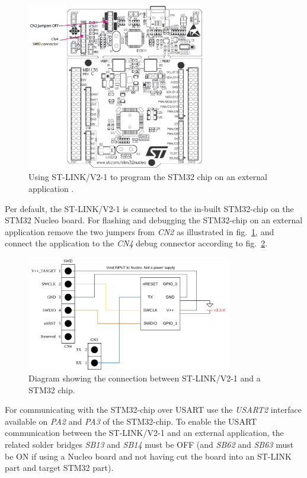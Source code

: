 \begin{figure}[H]
  \centering
  \includegraphics[width=0.7\textwidth]{figures/Nucleo_SWD.png}
  \caption{Using ST-LINK/V2-1 to program the STM32 chip on an external application \cite[p.~19]{STM32_Nucleo_user_manual}.}
  \label{fig:nucleo_swd}
\end{figure}

Per default, the ST-LINK/V2-1 is connected to the in-built STM32-chip on the STM32 Nucleo board. For flashing and debugging the STM32-chip on an external application remove the two jumpers from \textit{CN2} as illustrated in fig.~\ref{fig:nucleo_swd}, and connect the application to the \textit{CN4} debug connector according to fig.~\ref{fig:schematic_stlink}.

\begin{figure}[H]
  \centering
  \includegraphics[width=0.8\textwidth]{figures/STLink_SWD_wiring.png}
  \caption{Diagram showing the connection between ST-LINK/V2-1 and a STM32 chip.}
  \label{fig:schematic_stlink}
\end{figure}

For communicating with the STM32-chip over \ac{USART} use the \textit{USART2} interface available on \textit{PA2} and \textit{PA3} of the STM32-chip. To enable the \ac{USART} communication between the ST-LINK/V2-1 and an external application, the related solder bridges \textit{SB13} and \textit{SB14} must be OFF (and \textit{SB62} and \textit{SB63} must be ON if using a Nucleo board and not having cut the board into an ST-LINK part and target STM32 part)\cite[p.~25]{STM32_Nucleo_user_manual}.

